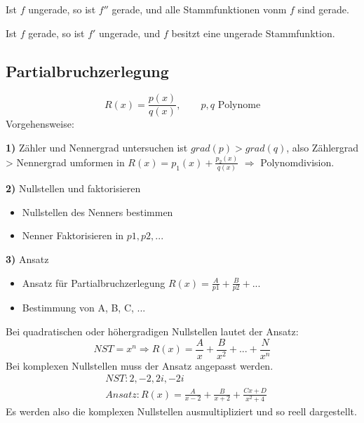 \begin{satz}
Ist $f$ ungerade, so ist $f''$ gerade, und alle Stammfunktionen vonm $f$ sind gerade.
\end{satz}
\begin{satz}
Ist $f$ gerade, so ist $f'$ ungerade, und $f$ besitzt eine ungerade Stammfunktion.
\end{satz}

\subsection{Partialbruchzerlegung}
	\begin{equation}
	  R(x) = \frac{p(x)}{q(x)}, \qquad p,q\text{ Polynome}
	\end{equation}
	Vorgehensweise:
	\begin{description}
	  \item{\textbf{1)}} Zähler und Nennergrad untersuchen\newline
	  ist $grad(p) > grad(q)$, also Zählergrad > Nennergrad umformen in  \newline$R(x) = p_1(x) + \frac{p_2(x)}{q(x)}$ $\Rightarrow$ Polynomdivision.
	  \item{\textbf{2)}} Nullstellen und faktorisieren
	    \begin{itemize}
	      \item Nullstellen des Nenners bestimmen
	      \item Nenner Faktorisieren in $p1, p2, ...$
	    \end{itemize}
	  \item{\textbf{3)}} Ansatz
	    \begin{itemize}
	      \item Ansatz für Partialbruchzerlegung $R(x) = \frac{A}{p1} + \frac{B}{p2} + ...$
	      \item Bestimmung von A, B, C, ...
	    \end{itemize}
	\end{description}
  Bei quadratischen oder höhergradigen Nullstellen lautet der Ansatz:
  \begin{equation}
    NST = x^n \Rightarrow R(x) = \frac{A}{x} + \frac{B}{x^2} + ... + \frac{N}{x^n}
  \end{equation}
  Bei komplexen Nullstellen muss der Ansatz angepasst werden.
  \begin{align}
    &NST: 2, -2, 2i, -2i \nonumber \\
    &Ansatz: R(x) = \frac{A}{x-2} + \frac{B}{x+2} + \frac{Cx + D}{x^2+4}
  \end{align}
  Es werden also die komplexen Nullstellen ausmultipliziert und so reell dargestellt.
  
